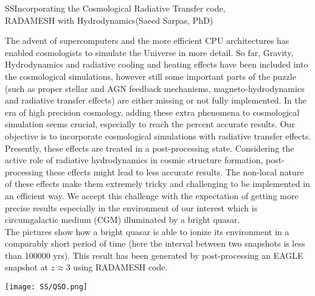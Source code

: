 \begin{section}{SS}{Incorporating the Cosmological Radiative Transfer code, \\
    \hspace*{4cm} RADAMESH with Hydrodynamics}{(Saeed Sarpas, PhD)}
  \begin{minipage}{\linewidth}
    \strut {\small The advent of supercomputers and the more efficient CPU
      architectures has enabled cosmologists to simulate the Universe in more
      detail. So far, Gravity, Hydrodynamics and radiative cooling and heating
      effects have been included into the cosmological simulations, however
      still some important parts of the puzzle (such as
      proper stellar and AGN feedback mechanisms, magneto-hydrodynamics and
      radiative transfer effects) are either missing or not fully implemented.
      In the era of high precision cosmology, adding these extra phenomena to
      cosmological simulation seems crucial,
      especially to reach the percent accurate results. Our objective is to
      incorporate cosmological simulations with radiative transfer effects.
      Presently, these effects are treated in a post-processing state.
      Considering the active role of radiative hydrodynamics in cosmic structure
      formation, post-processing these effects might lead to less accurate
      results. The
      non-local nature of these effects make them extremely tricky and
      challenging to be implemented in an efficient way. We accept this
      challenge with the expectation of getting more precise results especially
      in the environment of our interest which is circumgalactic medium
      (CGM) illuminated by a bright quasar.\\
      The pictures show how a bright quasar is able to ionize its
      environment in a comparably short period of time (here the interval
      between two snapshots is less than 100000 yrs). This
      result has been generated by post-processing an EAGLE snapshot at $z
      \approx 3$ using RADAMESH code.
    }
  \end{minipage}

  \vspace{0.5cm}

  \begin{minipage}{\linewidth}
    \begin{center}
      \texttt{[image: SS/QSO.png]}
    \end{center}
  \end{minipage}
\end{section}